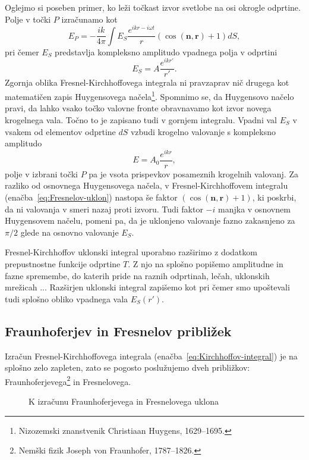 Oglejmo si poseben primer, ko leži točkast izvor svetlobe na osi okrogle odprtine. Polje 
v točki $P$ izračunamo kot 
\begin{equation}
\label{eq:Fresnelov-uklon}
E_P =  -\frac{ik}{4\pi} \int E_S\frac{ e^{ikr-i\omega t}}{r}\left(\cos(\mathbf{n},\mathbf{r})+1\right) dS,
\end{equation}
pri čemer $E_S$ predstavlja kompleksno amplitudo vpadnega polja v odprtini
\begin{equation}
E_S = A \frac{e^{ikr'}}{r'}.
\end{equation} 
Zgornja oblika Fresnel-Kirchhoffovega integrala ni pravzaprav nič drugega kot 
matematičen zapis Huygensovega 
načela\footnote{Nizozemski znanstvenik Christiaan Huygens, 1629--1695.}. 
Spomnimo se, da Huygensovo načelo pravi, da lahko vsako točko valovne fronte obravnavamo 
kot izvor novega krogelnega vala. Točno to je zapisano tudi v gornjem integralu. Vpadni val
$E_S$ v vsakem od elementov odprtine $dS$ vzbudi krogelno valovanje s
kompleksno amplitudo
\begin{equation}
E = A_0 \frac{e^{ikr}}{r},
\end{equation} 
polje v izbrani točki $P$ pa je vsota prispevkov posameznih krogelnih valovanj.
Za razliko od osnovnega Huygensovega načela, v Fresnel-Kirchhoffovem integralu 
(enačba~\ref{eq:Fresnelov-uklon})
nastopa še faktor $\left(\cos(\mathbf{n},\mathbf{r})+1\right)$, ki poskrbi, da ni valovanja 
v smeri nazaj proti izvoru. Tudi faktor $-i$ manjka v osnovnem Huygensovem načelu,
pomeni pa, da je uklonjeno valovanje fazno zakasnjeno za $\pi/2$ glede na osnovno
valovanje $E_S$.

Fresnel-Kirchhoffov uklonski integral uporabno razširimo z dodatkom prepustnostne funkcije odprtine $T$.
Z njo na splošno popišemo amplitudne in fazne spremembe, do katerih pride na raznih 
odprtinah, lečah, uklonskih mrežicah ... Razširjen uklonski integral zapišemo kot
pri čemer smo upoštevali tudi splošno obliko vpadnega vala $E_S(r')$.

\subsection*{Fraunhoferjev in Fresnelov približek}
\label{FFuklon}
Izračun Fresnel-Kirchhoffovega integrala (enačba~\ref{eq:Kirchhoffov-integral}) 
je na splošno zelo zapleten, zato se 
pogosto poslužujemo dveh približkov: Fraunhoferjevega\footnote{Nemški fizik 
Joseph von Fraunhofer, 1787--1826.} in Fresnelovega. 
\begin{figure}[!h]
\centering {} 
  
\caption{K izračunu Fraunhoferjevega in Fresnelovega uklona}
\label{fig:Uklon-koordinate}
\end{figure}

